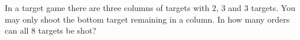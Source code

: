 In a target game there are three columns of targets with $2$, $3$ and $3$ targets. You may only shoot the bottom target remaining in a column. In how many orders can all $8$ targets be shot?

